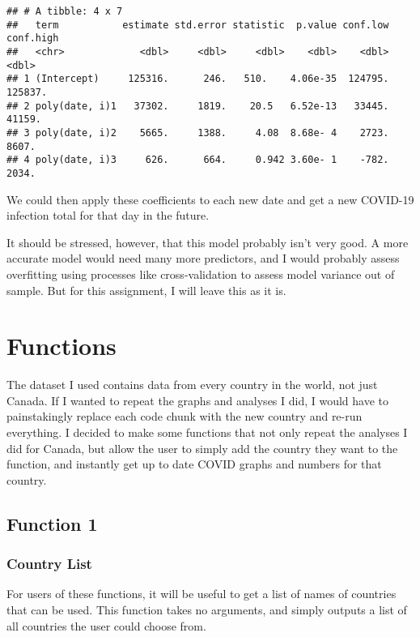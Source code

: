 \documentclass[]{tufte-handout}
\begin{document}
\begin{verbatim}
## # A tibble: 4 x 7
##   term           estimate std.error statistic  p.value conf.low conf.high
##   <chr>             <dbl>     <dbl>     <dbl>    <dbl>    <dbl>     <dbl>
## 1 (Intercept)     125316.      246.   510.    4.06e-35  124795.   125837.
## 2 poly(date, i)1   37302.     1819.    20.5   6.52e-13   33445.    41159.
## 3 poly(date, i)2    5665.     1388.     4.08  8.68e- 4    2723.     8607.
## 4 poly(date, i)3     626.      664.     0.942 3.60e- 1    -782.     2034.
\end{verbatim}

We could then apply these coefficients to each new date and get a new
COVID-19 infection total for that day in the future.

It should be stressed, however, that this model probably isn't very
good. A more accurate model would need many more predictors, and I would
probably assess overfitting using processes like cross-validation to
assess model variance out of sample. But for this assignment, I will
leave this as it is.

\hypertarget{functions}{%
\section{Functions}\label{functions}}

The dataset I used contains data from every country in the world, not
just Canada. If I wanted to repeat the graphs and analyses I did, I
would have to painstakingly replace each code chunk with the new country
and re-run everything. I decided to make some functions that not only
repeat the analyses I did for Canada, but allow the user to simply add
the country they want to the function, and instantly get up to date
COVID graphs and numbers for that country.

\hypertarget{function-1}{%
\subsection{Function 1}\label{function-1}}

\hypertarget{country-list}{%
\subsubsection{Country List}\label{country-list}}

For users of these functions, it will be useful to get a list of names
of countries that can be used. This function takes no arguments, and
simply outputs a list of all countries the user could choose from.
\end{document}
